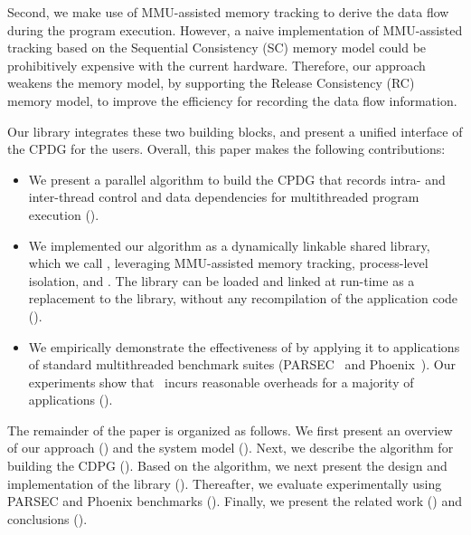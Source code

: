 Second, we make use of MMU-assisted memory tracking to derive the data flow during the program execution. However, a naive implementation of MMU-assisted tracking based on the Sequential Consistency (SC) memory model could be prohibitively expensive with the current hardware. Therefore,  our approach weakens the memory model, by supporting the Release Consistency (RC) memory model, to improve the efficiency for recording the data flow information.

Our library integrates these two building blocks, and present a unified interface of the CPDG for the users. Overall, this paper makes the following contributions:

\begin{itemize}
\item We present a parallel algorithm to build the CPDG that records intra- and inter-thread control and data dependencies for multithreaded program execution ().

\item We implemented our algorithm as a dynamically linkable shared library, which we call \projecttitle, leveraging MMU-assisted memory tracking, process-level isolation, and \intelpt.  The \projecttitle library can be loaded and linked at run-time as a replacement to the \pthreads library, without any recompilation  of the application code ().

\item We  empirically demonstrate  the effectiveness of \projecttitle by applying it to applications of standard multithreaded benchmark suites (PARSEC~\cite{parsec} and Phoenix~\cite{phoenix}). Our experiments show that \projecttitle~incurs reasonable overheads for a majority of applications ().



\end{itemize}


The remainder of the paper is organized as follows. We first present  an overview of our approach () and the system model (). Next, we describe the algorithm for building the CDPG (). Based on the algorithm, we next present the design and implementation of  the \projecttitle library  (). Thereafter, we evaluate \projecttitle experimentally using PARSEC and Phoenix benchmarks ().
Finally, we present the related work () and conclusions ().

